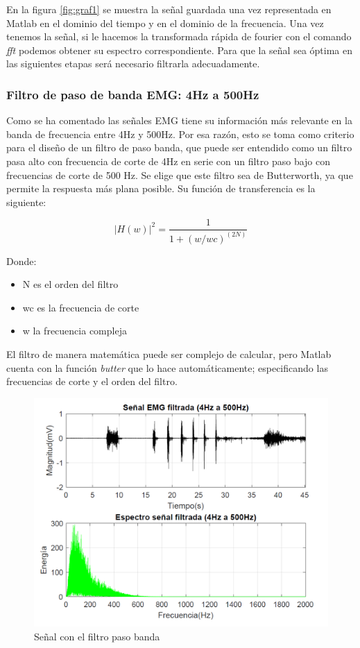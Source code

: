 En la figura \ref{fig:graf1} se muestra la señal guardada una vez representada en Matlab en el dominio del tiempo y en el dominio de la frecuencia. Una vez tenemos la señal, si le hacemos la transformada rápida de fourier con el comando \textit{fft} podemos obtener su espectro correspondiente. Para que la señal sea óptima en las siguientes etapas será necesario filtrarla adecuadamente.

\subsubsection{Filtro de paso de banda EMG: 4Hz a 500Hz} \label{sec:pasobanda}

Como se ha comentado las señales EMG tiene su información más relevante en la banda de frecuencia entre 4Hz y 500Hz. Por esa razón, esto se toma como  criterio para el diseño de un filtro de paso banda, que puede ser entendido como un filtro pasa alto con frecuencia de corte de 4Hz en serie con un filtro paso bajo con frecuencias de corte de 500 Hz. \newline
Se elige que este filtro sea de Butterworth, ya que permite la respuesta más plana posible. Su función de transferencia es la siguiente:

\begin{equation}
|H(w)|^2 = \frac{1}{1+(w/wc)^(2N)}
\end{equation}

Donde: 
\begin{itemize}
	\item N es el orden del filtro
	\item wc es la frecuencia de corte 
	\item w la frecuencia compleja 
\end{itemize}

El filtro  de manera matemática puede ser complejo de calcular, pero Matlab cuenta con la función \textit{butter}  que lo hace automáticamente; especificando las frecuencias de corte y el orden del filtro. 
\begin{figure}[H]
	\center
	\includegraphics[scale=0.5]{imagenes/Disenodelsistema/graf2.png}
	\caption{Señal con el filtro paso banda}
	\label{fig:graf2}
\end{figure}

